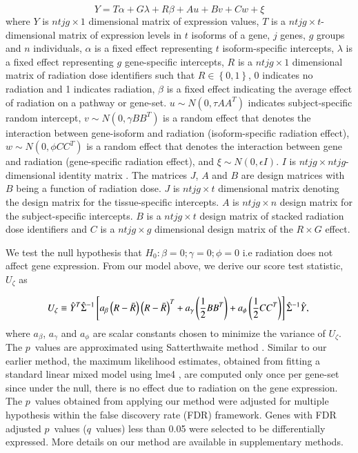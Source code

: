 \documentclass[hidelinks,11pt]{article}
\begin{document}
\begin{equation}
Y = T\alpha + G\lambda + R\beta + Au + Bv + Cw + \xi
\end{equation}
where $Y$ is $ntjg \times 1$ dimensional matrix of expression values, $T$ is a $ntjg \times t$-dimensional matrix of expression levels in $t$ isoforms of a gene, $j$ genes, $g$ groups and $n$ individuals, $\alpha$ is a fixed effect representing $t$ isoform-specific intercepts, $\lambda$ is a fixed effect representing $g$ gene-specific intercepts, $R$ is a $ntjg \times 1$ dimensional matrix of radiation dose identifiers such that $R\in\left\{0,1\right\}$, 0 indicates no radiation and 1 indicates radiation, $\beta$ is a fixed effect indicating the average effect of radiation on a pathway or gene-set. $u \sim N\left(0, \tau AA^T \right)$ indicates subject-specific random intercept, $v \sim N\left(0,\gamma BB^T \right)$ is a random effect that denotes the interaction between gene-isoform and radiation (isoform-specific radiation effect), $w \sim N\left(0,\phi CC^T \right)$ is a random effect that denotes the interaction between gene and radiation (gene-specific radiation effect), and $\xi \sim N\left(0, \epsilon I \right)$. $I$ is $ntjg \times ntjg$-dimensional identity matrix . The matrices $J$, $A$ and $B$ are design matrices with $B$ being a function of radiation dose. $J$ is $ntjg \times t$ dimensional matrix denoting the design matrix for the tissue-specific intercepts. $A$ is $ntjg \times n$ design matrix for the subject-specific intercepts. $B$ is a $ntjg \times t$ design matrix of stacked radiation dose identifiers and $C$ is a $ntjg \times g$ dimensional design matrix of the $R \times G$ effect. 

We test the null hypothesis that  $H_0: \beta = 0; \gamma=0; \phi=0$ i.e radiation does not affect gene expression. From our model above, we derive our score test statistic, $U_\zeta$ as

\begin{equation}
U_\zeta \equiv \hat{Y}^T  \hat{\Sigma}^{-1} \left[ a_\beta \left(R - \bar{R} \right) \left(R - \bar{R} \right)^T   + a_\gamma \left( \frac{1}{2} B B^T \right) + a_\phi \left( \frac{1}{2} C C^T \right) \right]  \hat{\Sigma}^{-1} \hat{Y}, \\
\end{equation}
where ${a_\beta}$, ${a_\gamma}$ and ${a_\phi}$ are scalar constants chosen to minimize the variance of $U_\zeta$. The $p$~values are approximated using Satterthwaite method \cite{satterthwaite}. Similar to our earlier method, the maximum likelihood estimates, obtained from fitting a standard linear mixed model using lme4 \cite{lme4}, are computed only once per gene-set since under the null, there is no effect due to radiation on the gene expression. The $p$~values obtained from applying our method were adjusted for multiple hypothesis within the false discovery rate (FDR) framework. Genes with FDR adjusted $p$~values ($q$~values) less than 0.05 were selected to be differentially expressed. More details on our method are available in supplementary methods. 
\end{document}
